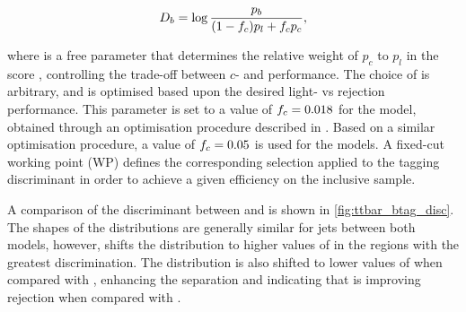 \begin{equation}\label{eq:btag-disc}
    \Db = \log{\frac{p_b}{(1-\fc )p_l + \fc  p_c}} ,
\end{equation}

where \fc is a free parameter that determines the relative weight of $p_c$ to $p_l$ in the score \Db, controlling the trade-off between $c$- and \lrej performance.
The choice of \fc is arbitrary, and is optimised based upon the desired light- vs \cjet rejection performance.
This parameter is set to a value of $f_c = 0.018$ for the \DLr model, obtained through an optimisation procedure described in .
Based on a similar optimisation procedure, a value of $f_c = 0.05$ is used for the \GNN models.
A fixed-cut working point (WP) defines the corresponding selection applied to the tagging discriminant \Db in order to achieve a given efficiency on the inclusive \ttbar sample.


A comparison of the \btag discriminant \Db between \DLr and \GNN is shown in \cref{fig:ttbar_btag_disc}. 
The shapes of the \Db distributions are generally similar for \bcl jets between both models, however, \GNN shifts the \bjet distribution to higher values of \Db in the regions with the greatest discrimination.
The \GNN \cjet distribution is also shifted to lower values of \Db when compared with \DLr, enhancing the separation and indicating that \GNN is improving \cjet rejection when compared with \DLr.

